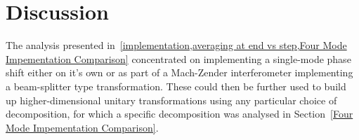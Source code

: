 \documentclass[aps,pra,twocolumn,superscriptaddress,numerical,floatfix]{revtex4-1}
\begin{document}
% 
% 
% 
%
%


\section{Discussion\label{Discussion}}

The analysis presented in~\cref{implementation,averaging at end vs step,Four Mode Impementation Comparison} concentrated on implementing a single-mode phase shift either on it's own or as part of a Mach-Zender interferometer implementing a beam-splitter type transformation.  These could then be further used to build up higher-dimensional unitary transformations using any particular choice of decomposition, for which a specific decomposition was analysed in Section~\ref{Four Mode Impementation Comparison}.
\end{document}

